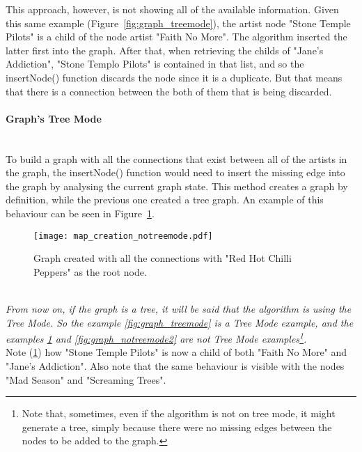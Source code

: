       This approach, however, is not showing all of the available information.
      Given this same example (Figure~\ref{fig:graph_treemode}), the artist node "Stone Temple Pilots" is a child of the node artist "Faith No More".
      The algorithm inserted the latter first into the graph.
      After that, when retrieving the childs of "Jane's Addiction", "Stone Templo Pilots" is contained in that list, and so the insertNode() function discards the node since it is a duplicate.
      But that means that there is a connection between the both of them that is being discarded.

      \paragraph{Graph's Tree Mode} \hfill \\
      To build a graph with all the connections that exist between all of the artists in the graph, the insertNode() function would need to insert the missing edge into the graph by analysing the current graph state.
      This method creates a graph by definition, while the previous one created a tree graph.
      An example of this behaviour can be seen in Figure~\ref{fig:graph_notreemode}.
      \begin{figure}[tb]
        \begin{center}
          \texttt{[image: map\_creation\_notreemode.pdf]}
        \end{center}
        \caption{Graph created with all the connections with "Red Hot Chilli Peppers" as the root node.}
        \label{fig:graph_notreemode}
      \end{figure}

      \hfill \\
      \indent \emph{
      From now on, if the graph is a tree, it will be said that the algorithm is using the \emph{Tree Mode}.
      So the example \ref{fig:graph_treemode} is a \emph{Tree Mode} example, and the examples \ref{fig:graph_notreemode} and \ref{fig:graph_notreemode2} are not \emph{Tree Mode} examples\footnote{
        Note that, sometimes, even if the algorithm is not on tree mode, it might generate a tree, simply because there were no missing edges between the nodes to be added to the graph.
      }.}
      \hfill \\

      Note (\ref{fig:graph_notreemode}) how "Stone Temple Pilots" is now a child of both "Faith No More" and "Jane's Addiction".
      Also note that the same behaviour is visible with the nodes "Mad Season" and "Screaming Trees".

